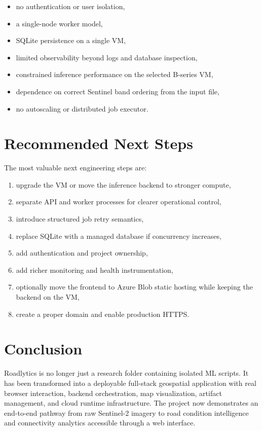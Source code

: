 \documentclass[conference]{IEEEtran}
\begin{document}
\begin{itemize}[leftmargin=16pt]
\item no authentication or user isolation,
\item a single-node worker model,
\item SQLite persistence on a single VM,
\item limited observability beyond logs and database inspection,
\item constrained inference performance on the selected B-series VM,
\item dependence on correct Sentinel band ordering from the input file,
\item no autoscaling or distributed job executor.
\end{itemize}

\section{Recommended Next Steps}
The most valuable next engineering steps are:

\begin{enumerate}[leftmargin=16pt]
\item upgrade the VM or move the inference backend to stronger compute,
\item separate API and worker processes for clearer operational control,
\item introduce structured job retry semantics,
\item replace SQLite with a managed database if concurrency increases,
\item add authentication and project ownership,
\item add richer monitoring and health instrumentation,
\item optionally move the frontend to Azure Blob static hosting while keeping the
backend on the VM,
\item create a proper domain and enable production HTTPS.
\end{enumerate}

\section{Conclusion}
Roadlytics is no longer just a research folder containing isolated ML scripts.
It has been transformed into a deployable full-stack geospatial application with
real browser interaction, backend orchestration, map visualization, artifact
management, and cloud runtime infrastructure. The project now demonstrates an
end-to-end pathway from raw Sentinel-2 imagery to road condition intelligence
and connectivity analytics accessible through a web interface.
\end{document}
